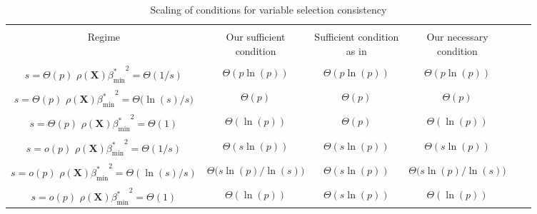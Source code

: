 \documentclass[bj,authoryear]{imsart}
\theoremstyle{plain}
\newcommand{\bs}{\boldsymbol}
\begin{document}
\begin{table}[ht]
\caption{Scaling of conditions for variable selection consistency}
\label{tab:scalings}
\begin{tabular}{@{}cccccc@{}}
\hline \\[-1em]
Regime & \thead{Our sufficient \\ condition} & \thead{Sufficient condition\\ as in \cite{infotheowainwright}} & \thead{Our necessary \\ condition} \\
\hline\\[-1em]
\thead{$s=\Theta(p)$\\$\rho(\bs X){\beta_{\min}^*}^2=\Theta(1/s)$}    & $\Theta(p\ln(p))$ & $\Theta(p\ln(p))$ & $\Theta(p\ln(p))$ \\\hline\\[-1em]
\thead{$s=\Theta(p)$\\$\rho(\bs X){\beta_{\min}^*}^2=\Theta\big(\ln(s)/s\big)$}    & $\Theta(p)$ & $\Theta(p)$ & $\Theta(p)$ \\\hline\\[-1em]
\thead{$s=\Theta(p)$\\$\rho(\bs X){\beta_{\min}^*}^2=\Theta(1)$}   & $\Theta(\ln(p))$ & $\Theta(p)$ & $\Theta(\ln(p))$ \\\hline\\[-1em]
\thead{$s=o(p)$\\$\rho(\bs X){\beta_{\min}^*}^2=\Theta(1/s)$}    & $\Theta(s\ln(p))$ & $\Theta(s\ln(p))$ & $\Theta(s\ln(p))$ \\\hline\\[-1em]
\thead{$s=o(p)$\\$\rho(\bs X){\beta_{\min}^*}^2=\Theta(\ln(s)/s)$}    & $\Theta\big(s\ln(p)/\ln(s)\big)$ & $\Theta(s\ln(p))$ & $\Theta\big(s\ln(p)/\ln(s)\big)$ \\\hline\\[-1em]
\thead{$s=o(p)$\\$\rho(\bs X){\beta_{\min}^*}^2=\Theta(1)$}    & $\Theta(\ln(p))$ & $\Theta(s\ln(p))$ & $\Theta(\ln(p))$ \\\hline
\end{tabular}
\end{table}


\end{document}
